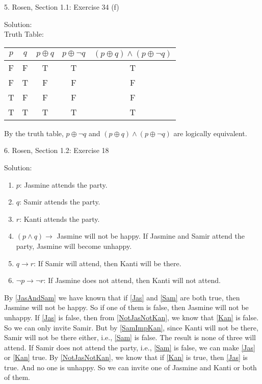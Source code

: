 \documentclass[12pt]{article}
\begin{document}
5. Rosen, Section 1.1: Exercise 34 (f)

\indent Solution:\\
\indent Truth Table:\\
\begin{center}
\begin{tabular}{c|c|c|c|c}
    $p$ & $q$ & $p \oplus q$ & $p \oplus \lnot q$ & $ (p \oplus q) \land (p \oplus \lnot q) $ \\
\hline
F & F & T & T & T \\
F & T & F & F & F \\
T & F & F & F & F \\
T & T & T & T & T \\
\end{tabular}
\end{center}

By the truth table, $p \oplus \lnot q$ and $(p\oplus q)\land(p\oplus \lnot q)$ are logically equivalent.
\newpage

6. Rosen, Section 1.2: Exercise 18 

\indent Solution:\\
\begin{enumerate}
\item \label{Jas} $p$: Jasmine attends the party.
\item \label{Sam} $q$: Samir attends the party.
\item \label{Kan} $r$: Kanti attends the party.
\item \label{JasAndSam} $(p \land q)\to$ Jasmine will not be happy. If Jasmine and Samir attend the party, Jasmine will become unhappy.
\item \label{SamImpKan} $q \to r$: If Samir will attend, then Kanti will be there.
\item \label{NotJasNotKan} $\lnot p \to \lnot r$: If Jasmine does not attend, then Kanti will not attend.
\end{enumerate}

By \ref{JasAndSam} we have known that if \ref{Jas} and \ref{Sam} are both true, then Jasmine will not be happy. So if one of them is false, then Jasmine will not be unhappy. If \ref{Jas} is false, then from \ref{NotJasNotKan}, we know that \ref{Kan}  is false. So we can only invite Samir. But by \ref{SamImpKan}, since Kanti will not be there, Samir will not be there either, i.e., \ref{Sam}  is false. The result is none of three will attend. If Samir does not attend the
party, i.e., \ref{Sam} is false, we can make \ref{Jas}  or \ref{Kan} true. By \ref{NotJasNotKan}, we know that if \ref{Kan} is true, then \ref{Jas} is true. And no one is unhappy. So we can invite one of Jasmine and Kanti or both of them.  
\newpage
\end{document}
